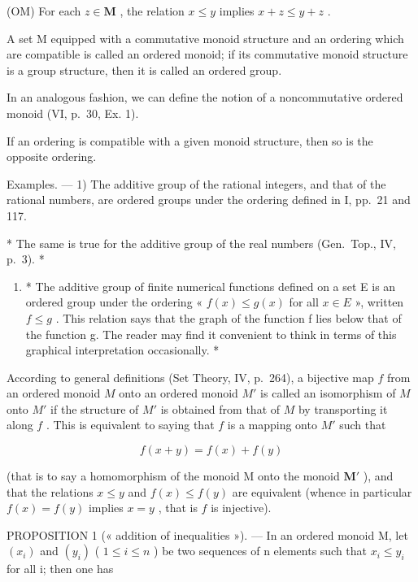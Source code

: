 (OM) For each \(z \in \mathbf{M}\) , the relation \(x \leqslant y\) implies \(x + z \leqslant y + z\) .

A set M equipped with a commutative monoid structure and an ordering which are compatible is called an ordered monoid; if its commutative monoid structure is a group structure, then it is called an ordered group.

In an analogous fashion, we can define the notion of a noncommutative ordered monoid (VI, p.~30, Ex. 1).

If an ordering is compatible with a given monoid structure, then so is the opposite ordering.

Examples. --- 1) The additive group of the rational integers, and that of the rational numbers, are ordered groups under the ordering defined in I, pp.~21 and 117.

* The same is true for the additive group of the real numbers (Gen.~Top., IV, p.~3). *

\begin{enumerate}
\def\labelenumi{\arabic{enumi})}
\setcounter{enumi}{1}
\tightlist
\item
  * The additive group of finite numerical functions defined on a set E is an ordered group under the ordering « \(f(x) \leq g(x)\) for all \(x \in E\) », written \(f \leq g\) . This relation says that the graph of the function f lies below that of the function g. The reader may find it convenient to think in terms of this graphical interpretation occasionally. *
\end{enumerate}

According to general definitions (Set Theory, IV, p.~264), a bijective map \(f\) from an ordered monoid \(M\) onto an ordered monoid \(M'\) is called an isomorphism of \(M\) onto \(M'\) if the structure of \(M'\) is obtained from that of \(M\) by transporting it along \(f\) . This is equivalent to saying that \(f\) is a mapping onto \(M'\) such that

\[
f (x + y) = f (x) + f (y)
\]

(that is to say a homomorphism of the monoid M onto the monoid \(\mathbf{M}'\) ), and that the relations \(x \leqslant y\) and \(f(x) \leqslant f(y)\) are equivalent (whence in particular \(f(x) = f(y)\) implies \(x = y\) , that is \(f\) is injective).

PROPOSITION 1 (« addition of inequalities »). --- In an ordered monoid M, let \((x_{i})\) and \((y_{i})\) ( \(1 \leqslant i \leqslant n\) ) be two sequences of n elements such that \(x_{i} \leqslant y_{i}\) for all i; then one has

